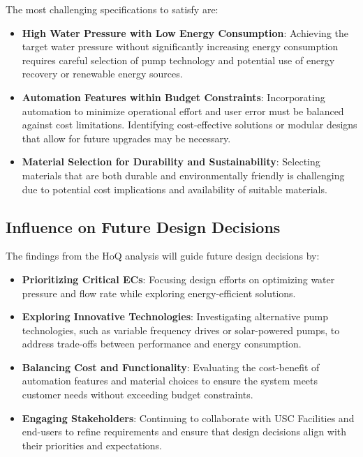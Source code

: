 \documentclass[12pt]{report}
\begin{document}
The most challenging specifications to satisfy are:

\begin{itemize}
    \item \textbf{High Water Pressure with Low Energy Consumption}: Achieving the target water pressure without significantly increasing energy consumption requires careful selection of pump technology and potential use of energy recovery or renewable energy sources.

    \item \textbf{Automation Features within Budget Constraints}: Incorporating automation to minimize operational effort and user error must be balanced against cost limitations. Identifying cost-effective solutions or modular designs that allow for future upgrades may be necessary.

    \item \textbf{Material Selection for Durability and Sustainability}: Selecting materials that are both durable and environmentally friendly is challenging due to potential cost implications and availability of suitable materials.

\end{itemize}

\subsection{Influence on Future Design Decisions}

The findings from the HoQ analysis will guide future design decisions by:

\begin{itemize}
    \item \textbf{Prioritizing Critical ECs}: Focusing design efforts on optimizing water pressure and flow rate while exploring energy-efficient solutions.

    \item \textbf{Exploring Innovative Technologies}: Investigating alternative pump technologies, such as variable frequency drives or solar-powered pumps, to address trade-offs between performance and energy consumption.

    \item \textbf{Balancing Cost and Functionality}: Evaluating the cost-benefit of automation features and material choices to ensure the system meets customer needs without exceeding budget constraints.

    \item \textbf{Engaging Stakeholders}: Continuing to collaborate with USC Facilities and end-users to refine requirements and ensure that design decisions align with their priorities and expectations.

\end{itemize}
\end{document}
